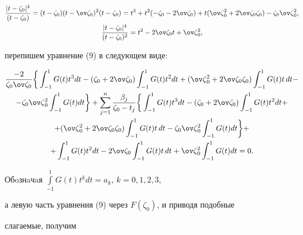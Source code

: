 \begin{gather*} 


\frac{|t-\zeta_0|^4}{(t-\zeta_0)}= 


(t-\zeta_0)(t-\ov\zeta_0)^2 (t-\zeta_0)= 


t^3+t^2(-\zeta_0-2\ov\zeta_0)+ 


t(\ov\zeta{}^2_0+2\ov\zeta_0\zeta_0)-\zeta_0\ov\zeta{}^2_0,\\ 


% 


\frac{|t-\zeta_0|^4}{(t-\zeta_0)^2}= 


t^2-2\ov\zeta_0t+\ov\zeta{}^2_0, 


\end{gather*} 


перепишем уравнение (9) в следующем виде: 


\begin{multline*} 


\frac{-2}{\zeta_0\ov\zeta_0}\bigg\{\int^1_{-1}G(t)t^3dt- 


(\zeta_0+2\ov\zeta_0)\int^1_{-1}G(t)t^2dt+ 


(\ov\zeta{}^2_0+2\ov\zeta_0\zeta_0)\int^1_{-1}G(t)t\,dt - \\ 


% 


-\zeta_0\ov\zeta{}^2_0\int^1_{-1}G(t)dt\bigg\}+ 


\sum^n_{j=1}\frac{\beta_j}{\zeta_0-t_j}\bigg\{\int^1_{-1} 


G(t)t^3dt-(\zeta_0+2\ov\zeta_0)\int^1_{-1}G(t)t^2dt+ \\ 


% 


+(\ov\zeta{}^2_0+2\ov\zeta_0\zeta_0)\int^1_{-1}G(t)t\,dt- 


\zeta_0\ov\zeta{}^2_0\int^1_{-1}G(t)dt\bigg\}+ \\ 


% 


+\int^1_{-1}G(t)t^2dt-2\ov\zeta_0\int^1_{-1}G(t)t\,dt 


+\ov\zeta{}^2_0\int^1_{-1}G(t)dt=0. 


\end{multline*} 


 


Обoзнaчaя $\int\limits^1_{-1}G(t)t^k dt=a_k$, $k=0,1,2,3$, 


а левую часть уравнения (9) через $F(\zeta_0)$, и приводя подобные 


слагаемые, получим 


